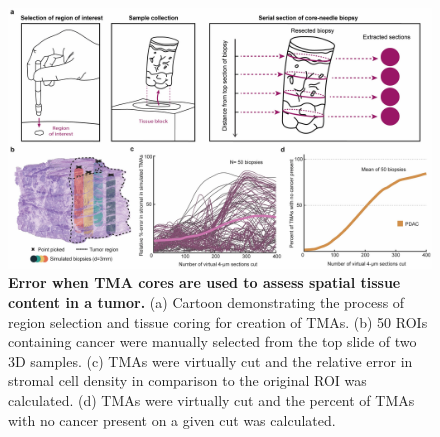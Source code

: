 \begin{refsection}
    \begin{figure}[h!]
        \begin{center}
            \includegraphics[width=\textwidth,clip,page=1] {figures/chapter2/PDAC_Fig_3.jpg}
            \caption{\textbf{Error when TMA cores are used to assess spatial tissue content in a tumor.} (a) Cartoon demonstrating the process of region selection and tissue coring for creation of TMAs. (b) 50 ROIs containing cancer were manually selected from the top slide of two 3D samples. (c) TMAs were virtually cut and the relative error in stromal cell density in comparison to the original ROI was calculated. (d) TMAs were virtually cut and the percent of TMAs with no cancer present on a given cut was calculated.}
            \label{chapter2_fig3}
        \end{center}
    \end{figure}
    

\end{refsection}
